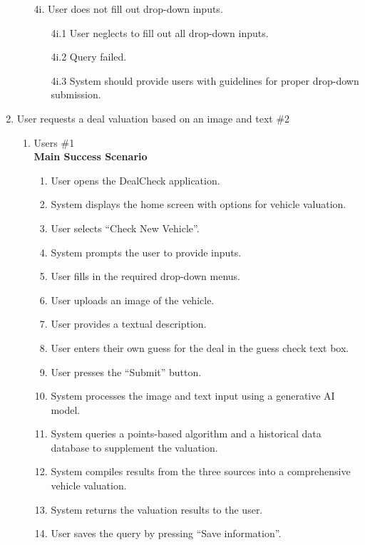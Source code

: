 \documentclass[]{article}
\begin{document}
\begin{enumerate}[{\bf {BE}1.}]
\begin{enumerate}
\begin{enumerate}
      \end{enumerate}
      \item[4i.] User does not fill out drop-down inputs.
      \begin{enumerate}
        \item[4i.1] User neglects to fill out all drop-down inputs.
        \item[4i.2] Query failed.
        \item[4i.3] System should provide users with guidelines for proper drop-down submission.
      \end{enumerate}
    \end{enumerate}

\item User requests a deal valuation based on an image and text \#2
    \begin{enumerate}[{\bf VP1.}]
      \item Users \#1 \\
        \textbf{Main Success Scenario}
        \begin{enumerate}[1.]
          \item User opens the DealCheck application.
          \item System displays the home screen with options for vehicle valuation.
          \item User selects ``Check New Vehicle''.
          \item System prompts the user to provide inputs.
          \item User fills in the required drop-down menus.
          \item User uploads an image of the vehicle.
          \item User provides a textual description.
          \item User enters their own guess for the deal in the guess check text box.
          \item User presses the ``Submit'' button.
          \item System processes the image and text input using a generative AI model.
          \item System queries a points-based algorithm and a historical data database to supplement the valuation.
          \item System compiles results from the three sources into a comprehensive vehicle valuation.
          \item System returns the valuation results to the user.
          \item User saves the query by pressing ``Save information''.

\end{enumerate}
\end{enumerate}
\end{enumerate}
\end{document}
